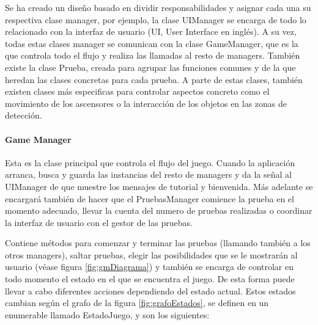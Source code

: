Se ha creado un diseño basado en dividir responsabilidades y asignar cada una su respectiva clase manager, por ejemplo, la clase UIManager se encarga de todo lo relacionado con la interfaz de usuario (UI, User Interface en inglés). A su vez, todas estas clases manager se comunican con la clase GameManager, que es la que controla todo el flujo y realiza las llamadas al resto de managers. También existe la clase Prueba, creada para agrupar las funciones comunes y de la que heredan las clases concretas para cada prueba. A parte de estas clases, también existen clases más especificas para controlar aspectos concreto como el movimiento de los ascensores o la interacción de los objetos en las zonas de detección.

\paragraph{Game Manager}

Esta es la clase principal que controla el flujo del juego. Cuando la aplicación arranca, busca y guarda las instancias del resto de managers y da la señal al UIManager de que muestre los mensajes de tutorial y bienvenida. Más adelante se encargará también de hacer que el PruebasManager comience la prueba en el momento adecuado, llevar la cuenta del numero de pruebas realizadas o coordinar la interfaz de usuario con el gestor de las pruebas. 

Contiene métodos para comenzar y terminar las pruebas (llamando también a los otros managers), saltar pruebas, elegir las posibilidades que se le mostrarán al usuario (véase figura \ref{fig:gmDiagrama}) y también se encarga de controlar en todo momento el estado en el que se encuentra el juego. De esta forma puede llevar a cabo diferentes acciones dependiendo del estado actual. Estos estados cambian según el grafo de la figura \ref{fig:grafoEstados}, se definen en un enumerable llamado EstadoJuego, y son los siguientes:

